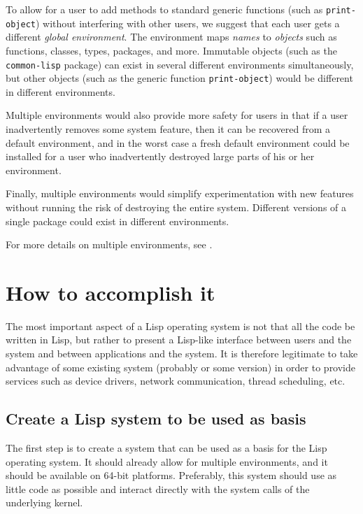To allow for a user to add methods to standard generic functions (such
as \texttt{print-object}) without interfering with other users, we
suggest that each user gets a different \emph{global environment}.
The environment maps \emph{names} to \emph{objects} such as functions,
classes, types, packages, and more.  Immutable objects (such as the
\texttt{common-lisp} package) can exist in several different
environments simultaneously, but other objects (such as the generic
function \texttt{print-object}) would be different in different
environments.

Multiple environments would also provide more safety for users in
that if a user inadvertently removes some system feature, then it
can be recovered from a default environment, and in the worst case a
fresh default environment could be installed for a user who
inadvertently destroyed large parts of his or her environment. 

Finally, multiple environments would simplify experimentation with
new features without running the risk of destroying the entire
system.  Different versions of a single package could exist in
different environments.

For more details on multiple environments, see
.

\section{How to accomplish it}

The most important aspect of a Lisp operating system is not that all
the code be written in Lisp, but rather to present a Lisp-like
interface between users and the system and between applications and
the system.  It is therefore legitimate to take advantage of some
existing system (probably \linux{} or some \bsd{} version) in order to
provide services such as device drivers, network communication, thread
scheduling, etc.

\subsection{Create a Lisp system to be used as basis}

The first step is to create a \cl{} system that can be used as a basis
for the Lisp operating system.  It should already allow for multiple
environments, and it should be available on 64-bit platforms.
Preferably, this system should use as little \clanguage{} code as
possible and interact directly with the system calls of the underlying
kernel.

